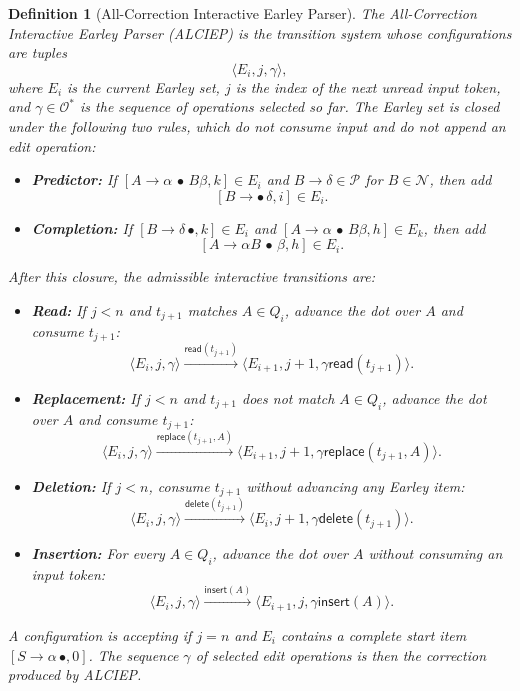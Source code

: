 \documentclass[11pt,a4paper]{article}
\newtheorem{definition}{Definition}
\newcommand{\NonTerminals}{\mathcal{N}}
\newcommand{\Rules}{\mathcal{P}}
\newcommand{\Edits}{\mathcal{O}}
\begin{document}
\begin{definition}[All-Correction Interactive Earley Parser]
  The All-Correction Interactive Earley Parser (ALCIEP) is the transition
  system whose configurations are tuples
  \[
    \langle E_i,j,\gamma\rangle,
  \]
  where $E_i$ is the current Earley set, $j$ is the index of the next unread
  input token, and $\gamma\in\Edits^{*}$ is the sequence of operations
  selected so far.  The Earley set is closed under the following two rules,
  which do not consume input and do not append an edit operation:
  \begin{itemize}[leftmargin=*]
    \item \textbf{Predictor:} If
    $[A\to\alpha\,\bullet\,B\beta,k]\in E_i$ and
    $B\to\delta\in\Rules$ for $B\in\NonTerminals$, then add
    \[
      [B\to\bullet\,\delta,i]\in E_i.
    \]

    \item \textbf{Completion:} If
    $[B\to\delta\,\bullet,k]\in E_i$ and
    $[A\to\alpha\,\bullet\,B\beta,h]\in E_k$, then add
    \[
      [A\to\alpha B\,\bullet\,\beta,h]\in E_i.
    \]
  \end{itemize}
  After this closure, the admissible interactive transitions are:
  \begin{itemize}[leftmargin=*]
    \item \textbf{Read:} If $j<n$ and $t_{j+1}$ matches $A\in Q_i$, advance
    the dot over $A$ and consume $t_{j+1}$:
    \[
      \langle E_i,j,\gamma\rangle
      \xrightarrow{\mathsf{read}(t_{j+1})}
      \langle E_{i+1},j+1,\gamma\mathsf{read}(t_{j+1})\rangle.
    \]

    \item \textbf{Replacement:} If $j<n$ and $t_{j+1}$ does not match
    $A\in Q_i$, advance the dot over $A$ and consume $t_{j+1}$:
    \[
      \langle E_i,j,\gamma\rangle
      \xrightarrow{\mathsf{replace}(t_{j+1},A)}
      \langle E_{i+1},j+1,
        \gamma\mathsf{replace}(t_{j+1},A)\rangle.
    \]

    \item \textbf{Deletion:} If $j<n$, consume $t_{j+1}$ without advancing
    any Earley item:
    \[
      \langle E_i,j,\gamma\rangle
      \xrightarrow{\mathsf{delete}(t_{j+1})}
      \langle E_i,j+1,\gamma\mathsf{delete}(t_{j+1})\rangle.
    \]

    \item \textbf{Insertion:} For every $A\in Q_i$, advance the dot over
    $A$ without consuming an input token:
    \[
      \langle E_i,j,\gamma\rangle
      \xrightarrow{\mathsf{insert}(A)}
      \langle E_{i+1},j,\gamma\mathsf{insert}(A)\rangle.
    \]
  \end{itemize}
  A configuration is accepting if $j=n$ and $E_i$ contains a complete start
  item $[S\to\alpha\,\bullet,0]$.  The sequence $\gamma$ of selected edit
  operations is then the correction produced by ALCIEP.
\end{definition}
\end{document}
